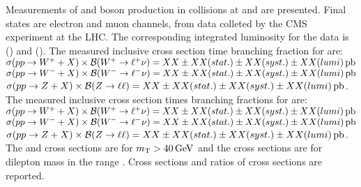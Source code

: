 % 
% 
%
Measurements of \W and \Z boson production in \pp collisions at \sg and \sh are presented. Final states are electron and muon channels, from data colleted by the CMS experiment at the LHC. The corresponding integrated luminosity for the data is \lumig (\sg) and \lumih (\sh). The measured inclusive cross section time branching fraction for \sg are: \\
$\sigma(pp\to W^++X)\times\mathcal{B}(W^+\to \ell^+ \nu) = XX \pm XX (stat.) \pm XX (syst.) \pm XX (lumi) \,\mathrm{pb}$
$\sigma(pp\to W^-+X)\times\mathcal{B}(W^-\to \ell^- \nu) = XX \pm XX (stat.) \pm XX (syst.) \pm XX (lumi) \,\mathrm{pb}$
$\sigma(pp\to Z+X)\times\mathcal{B}(Z\to \ell \ell) = XX \pm XX (stat.) \pm XX (syst.) \pm XX (lumi) \,\mathrm{pb}$. \\
The measured inclusive cross section times branching fractions for \sh are:\\
$\sigma(pp\to W^++X)\times\mathcal{B}(W^+\to \ell^+ \nu) = XX \pm XX (stat.) \pm XX (syst.) \pm XX (lumi) \,\mathrm{pb}$
$\sigma(pp\to W^-+X)\times\mathcal{B}(W^-\to \ell^- \nu) = XX \pm XX (stat.) \pm XX (syst.) \pm XX (lumi) \,\mathrm{pb}$
$\sigma(pp\to Z+X)\times\mathcal{B}(Z\to \ell \ell) = XX \pm XX (stat.) \pm XX (syst.) \pm XX (lumi) \,\mathrm{pb}$. \\
The \Wp and \Wm cross sections are for $m_{\mathrm{T}} > 40 \,\text{Ge\hspace{-.08em}V}$ and the \Z cross sections are for dilepton mass in the range \masswindow. Cross sections and ratios of cross sections are reported. 